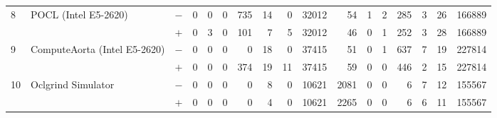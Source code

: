 \begin{tabular}{lll | rrrrrrr | rrrrrrr }
\hline
\multirow{ 2}{*}{8} & \multirow{ 2}{*}{POCL (Intel E5-2620)} & $-$ & 0 & 0 & 0 & 735 & 14 & 0 & 32012       & 54 & 1 & 2 & 285 & 3 & 26 & 166889 \\& & $+$ & 0 & 3 & 0 & 101 & 7 & 5 & 32012 & 46 & 0 & 1 & 252 & 3 & 28 & 166889 \\
\hline
\multirow{ 2}{*}{9} & \multirow{ 2}{*}{ComputeAorta (Intel E5-2620)} & $-$ & 0 & 0 & 0 & 0 & 18 & 0 & 37415       & 51 & 0 & 1 & 637 & 7 & 19 & 227814 \\& & $+$ & 0 & 0 & 0 & 374 & 19 & 11 & 37415 & 59 & 0 & 0 & 446 & 2 & 15 & 227814 \\
\hline
\multirow{ 2}{*}{10} & \multirow{ 2}{*}{Oclgrind Simulator} & $-$ & 0 & 0 & 0 & 0 & 8 & 0 & 10621       & 2081 & 0 & 0 & 6 & 7 & 12 & 155567 \\& & $+$ & 0 & 0 & 0 & 0 & 4 & 0 & 10621 & 2265 & 0 & 0 & 6 & 6 & 11 & 155567 \\
  \bottomrule
\end{tabular}

